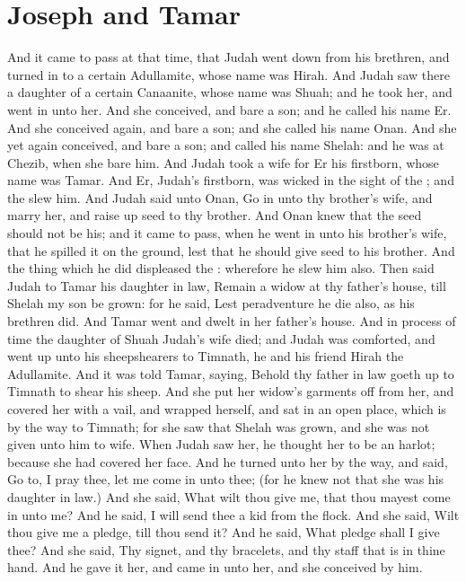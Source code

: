 \section*{Joseph and Tamar}
\begin{biblechapter} %
\verse And it came to pass at that time, that Judah went down from his brethren, and turned in to a certain Adullamite, whose name was Hirah.
\verse And Judah saw there a daughter of a certain Canaanite, whose name was Shuah; and he took her, and went in unto her.
\verse And she conceived, and bare a son; and he called his name Er.
\verse And she conceived again, and bare a son; and she called his name Onan.
\verse And she yet again conceived, and bare a son; and called his name Shelah: and he was at Chezib, when she bare him.
\verse And Judah took a wife for Er his firstborn, whose name was Tamar.
\verse And Er, Judah's firstborn, was wicked in the sight of the \LORD; and the \LORD slew him.
\verse And Judah said unto Onan, Go in unto thy brother's wife, and marry her, and raise up seed to thy brother.
\verse And Onan knew that the seed should not be his; and it came to pass, when he went in unto his brother's wife, that he spilled it on the ground, lest that he should give seed to his brother.
\verse And the thing which he did displeased the \LORD: wherefore he slew him also.
\verse Then said Judah to Tamar his daughter in law, Remain a widow at thy father's house, till Shelah my son be grown: for he said, Lest peradventure he die also, as his brethren did. And Tamar went and dwelt in her father's house.
\verse And in process of time the daughter of Shuah Judah's wife died; and Judah was comforted, and went up unto his sheepshearers to Timnath, he and his friend Hirah the Adullamite.
\verse And it was told Tamar, saying, Behold thy father in law goeth up to Timnath to shear his sheep.
\verse And she put her widow's garments off from her, and covered her with a vail, and wrapped herself, and sat in an open place, which is by the way to Timnath; for she saw that Shelah was grown, and she was not given unto him to wife.
\verse When Judah saw her, he thought her to be an harlot; because she had covered her face.
\verse And he turned unto her by the way, and said, Go to, I pray thee, let me come in unto thee; (for he knew not that she was his daughter in law.) And she said, What wilt thou give me, that thou mayest come in unto me?
\verse And he said, I will send thee a kid from the flock. And she said, Wilt thou give me a pledge, till thou send it?
\verse And he said, What pledge shall I give thee? And she said, Thy signet, and thy bracelets, and thy staff that is in thine hand. And he gave it her, and came in unto her, and she conceived by him.

\end{biblechapter}
